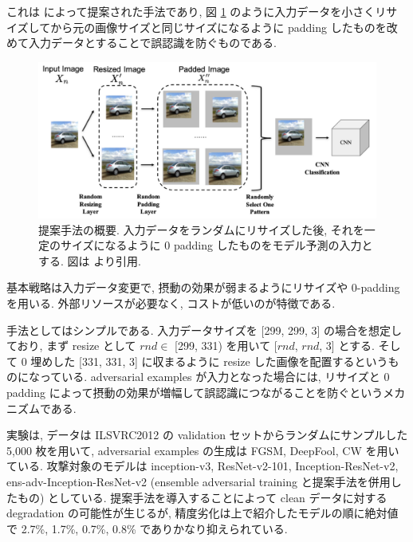 これは \cite{xie2017mitigating} によって提案された手法であり, 図 \ref{fig:mitigating-adversarial-summary} のように入力データを小さくリサイズしてから元の画像サイズと同じサイズになるように padding したものを改めて入力データとすることで誤認識を防ぐものである.
%
\begin{figure}[htbp]
\begin{center}
\includegraphics[width=14.0cm]{figures/mitigating-adversarial-summary.pdf}
\end{center}
\caption{
提案手法の概要.
入力データをランダムにリサイズした後, それを一定のサイズになるように 0 padding したものをモデル予測の入力とする.
図は \cite{xie2017mitigating} より引用.
}
\label{fig:mitigating-adversarial-summary}
\end{figure}

基本戦略は入力データ変更で, 摂動の効果が弱まるようにリサイズや 0-padding を用いる.
外部リソースが必要なく, コストが低いのが特徴である.

手法としてはシンプルである.
入力データサイズを [299, 299, 3] の場合を想定しており, まず resize として $rnd \in$ [299, 331) を用いて [$rnd$, $rnd$, 3] とする.
そして 0 埋めした [331, 331, 3] に収まるように resize した画像を配置するというものになっている.
adversarial examples が入力となった場合には, リサイズと 0 padding によって摂動の効果が増幅して誤認識につながることを防ぐというメカニズムである.

実験は, データは ILSVRC2012 の validation セットからランダムにサンプルした 5,000 枚を用いて, adversarial examples の生成は FGSM, DeepFool, CW を用いている.
攻撃対象のモデルは inception-v3, ResNet-v2-101, Inception-ResNet-v2, ens-adv-Inception-ResNet-v2 (ensemble adversarial training と提案手法を併用したもの) としている.
提案手法を導入することによって clean データに対する degradation の可能性が生じるが, 精度劣化は上で紹介したモデルの順に絶対値で 2.7\%, 1.7\%, 0.7\%, 0.8\% でありかなり抑えられている.

